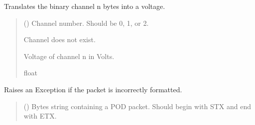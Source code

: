 \documentclass[letterpaper,10pt,english]{sphinxmanual}
\begin{document}
\begin{fulllineitems}
\begin{fulllineitems}
\begin{quote}
\begin{description}
\end{description}\end{quote}

\end{fulllineitems}


\begin{fulllineitems}
\label{\detokenize{PodApi.Packets:PodApi.Packets.Binary4.PacketBinary4.Ch}}
\pysigstartsignatures
{}
\pysigstopsignatures
\sphinxAtStartPar
Translates the binary channel n bytes into a voltage.
\begin{quote}\begin{description}
\sphinxAtStartPar
{} () \textendash{} Channel number. Should be 0, 1, or 2.

\sphinxAtStartPar
{} \textendash{} Channel does not exist.

\sphinxAtStartPar
Voltage of channel n in Volts.

\sphinxAtStartPar
float

\end{description}\end{quote}

\end{fulllineitems}


\begin{fulllineitems}
\label{\detokenize{PodApi.Packets:PodApi.Packets.Binary4.PacketBinary4.CheckIfPacketIsValid}}
\pysigstartsignatures
{}
\pysigstopsignatures
\sphinxAtStartPar
Raises an Exception if the packet is incorrectly formatted.
\begin{quote}\begin{description}
\sphinxAtStartPar
{} () \textendash{} Bytes string containing a POD packet. Should begin with STX                 and end with ETX.


\end{description}
\end{quote}
\end{fulllineitems}
\end{fulllineitems}
\end{document}
